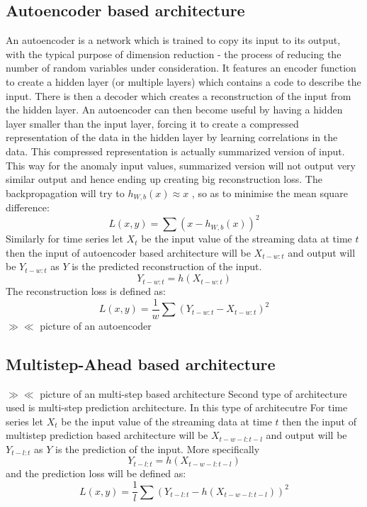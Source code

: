 \documentclass[12pt]{article}
\begin{document}
\subsection{Autoencoder based architecture}
An autoencoder is a network which is trained to copy its input to its output, with the typical purpose of dimension reduction - the process of reducing the number of random variables under consideration. It features an encoder function to create a hidden layer (or multiple layers) which contains a code to describe the input. There is then a decoder which creates a reconstruction of the input from the hidden layer. An autoencoder can then become useful by having a hidden layer smaller than the input layer, forcing it to create a compressed representation of the data in the hidden layer by learning correlations in the data. This compressed representation is actually summarized version of input. This way for the anomaly input values, summarized version will not output very similar output and hence ending up creating big reconstruction loss.
The backpropagation will try to  $h_{W,b}(x) \approx x$ , so as to minimise the mean square difference:
\begin{equation}
L(x,y) = \sum(x-h_{W,b}(x))^2
\end{equation}
Similarly for time series let $X_t$ be the input value of the streaming data at time $t$ then the input of autoencoder based architecture will be $X_{t-w:t}$ and output will be $Y_{t-w:t}$ as $Y$ is the predicted reconstruction of the input. 
\begin{equation}
Y_{t-w:t} = h(X_{t-w:t})
\end{equation}
The reconstruction loss is defined as:
\begin{equation}
L(x,y) = \frac{1}{w}\sum(Y_{t-w:t}-X_{t-w:t})^2
\end{equation}
$\gg \ll$ picture of an autoencoder
\subsection{Multistep-Ahead based architecture}
$\gg \ll$ picture of an multi-step based architecture
Second type of architecture used is multi-step prediction architecture. In this type of architecutre 
For time series let $X_t$ be the input value of the streaming data at time $t$ then the input of multistep prediction based architecture will be $X_{t-w-l:t-l}$ and output will be $Y_{t-l:t}$ as $Y$ is the prediction of the input. 
More specifically
\begin{equation}
Y_{t-l:t} = h(X_{t-w-l:t-l})
\end{equation}
and the prediction loss will be defined as:
\begin{equation}
L(x,y) = \frac{1}{l}\sum(Y_{t-l:t}-h(X_{t-w-l:t-l}))^2
\end{equation}
\end{document}
